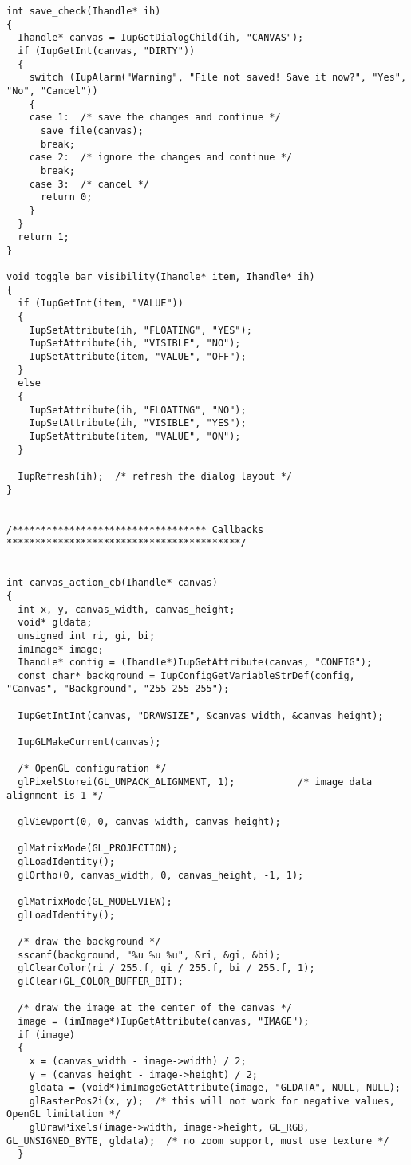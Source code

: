 \documentclass{ctexart}
\begin{document}
\begin{lstlisting}
int save_check(Ihandle* ih)
{
  Ihandle* canvas = IupGetDialogChild(ih, "CANVAS");
  if (IupGetInt(canvas, "DIRTY"))
  {
    switch (IupAlarm("Warning", "File not saved! Save it now?", "Yes", "No", "Cancel"))
    {
    case 1:  /* save the changes and continue */
      save_file(canvas);
      break;
    case 2:  /* ignore the changes and continue */
      break;
    case 3:  /* cancel */
      return 0;  
    }
  }
  return 1;
}

void toggle_bar_visibility(Ihandle* item, Ihandle* ih)
{
  if (IupGetInt(item, "VALUE"))
  {
    IupSetAttribute(ih, "FLOATING", "YES");
    IupSetAttribute(ih, "VISIBLE", "NO");
    IupSetAttribute(item, "VALUE", "OFF");
  }
  else
  {
    IupSetAttribute(ih, "FLOATING", "NO");
    IupSetAttribute(ih, "VISIBLE", "YES");
    IupSetAttribute(item, "VALUE", "ON");
  }

  IupRefresh(ih);  /* refresh the dialog layout */
}


/********************************** Callbacks *****************************************/


int canvas_action_cb(Ihandle* canvas)
{
  int x, y, canvas_width, canvas_height;
  void* gldata;
  unsigned int ri, gi, bi;
  imImage* image;
  Ihandle* config = (Ihandle*)IupGetAttribute(canvas, "CONFIG");
  const char* background = IupConfigGetVariableStrDef(config, "Canvas", "Background", "255 255 255");

  IupGetIntInt(canvas, "DRAWSIZE", &canvas_width, &canvas_height);

  IupGLMakeCurrent(canvas);

  /* OpenGL configuration */
  glPixelStorei(GL_UNPACK_ALIGNMENT, 1);           /* image data alignment is 1 */

  glViewport(0, 0, canvas_width, canvas_height);

  glMatrixMode(GL_PROJECTION);
  glLoadIdentity();
  glOrtho(0, canvas_width, 0, canvas_height, -1, 1);

  glMatrixMode(GL_MODELVIEW);
  glLoadIdentity();

  /* draw the background */
  sscanf(background, "%u %u %u", &ri, &gi, &bi);
  glClearColor(ri / 255.f, gi / 255.f, bi / 255.f, 1);
  glClear(GL_COLOR_BUFFER_BIT);

  /* draw the image at the center of the canvas */
  image = (imImage*)IupGetAttribute(canvas, "IMAGE");
  if (image)
  {
    x = (canvas_width - image->width) / 2;
    y = (canvas_height - image->height) / 2;
    gldata = (void*)imImageGetAttribute(image, "GLDATA", NULL, NULL);
    glRasterPos2i(x, y);  /* this will not work for negative values, OpenGL limitation */
    glDrawPixels(image->width, image->height, GL_RGB, GL_UNSIGNED_BYTE, gldata);  /* no zoom support, must use texture */
  }


\end{lstlisting}
\end{document}
